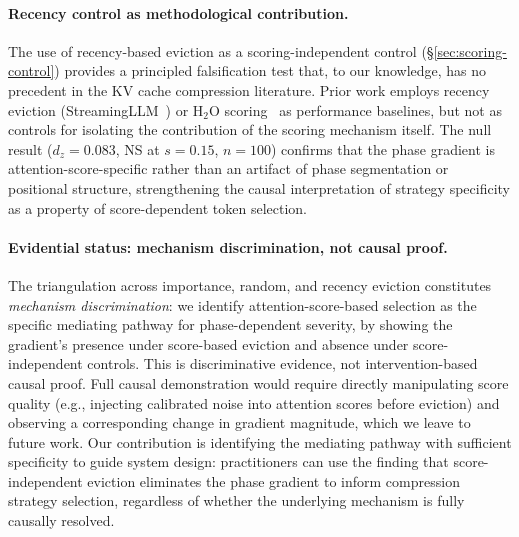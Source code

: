 \paragraph{Recency control as methodological contribution.}
The use of recency-based eviction as a scoring-independent control (\S\ref{sec:scoring-control}) provides a principled falsification test that, to our knowledge, has no precedent in the KV cache compression literature. Prior work employs recency eviction (StreamingLLM~\cite{streamingllm-iclr2024}) or H$_2$O scoring~\cite{h2o-neurips2023} as performance baselines, but not as controls for isolating the contribution of the scoring mechanism itself. The null result ($d_z{=}0.083$, NS at $s{=}0.15$, $n{=}100$) confirms that the phase gradient is attention-score-specific rather than an artifact of phase segmentation or positional structure, strengthening the causal interpretation of strategy specificity as a property of score-dependent token selection.

\paragraph{Evidential status: mechanism discrimination, not causal proof.}
The triangulation across importance, random, and recency eviction constitutes \emph{mechanism discrimination}: we identify attention-score-based selection as the specific mediating pathway for phase-dependent severity, by showing the gradient's presence under score-based eviction and absence under score-independent controls. This is discriminative evidence, not intervention-based causal proof. Full causal demonstration would require directly manipulating score quality (e.g., injecting calibrated noise into attention scores before eviction) and observing a corresponding change in gradient magnitude, which we leave to future work. Our contribution is identifying the mediating pathway with sufficient specificity to guide system design: practitioners can use the finding that score-independent eviction eliminates the phase gradient to inform compression strategy selection, regardless of whether the underlying mechanism is fully causally resolved.
